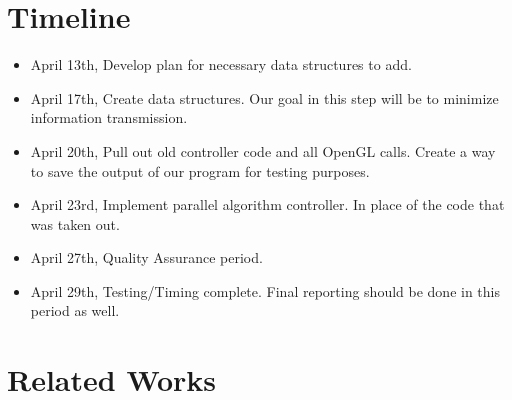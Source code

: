 \documentclass{acmsiggraph}
\begin{document}
\section*{Timeline}
\begin{itemize}
\item April 13th, Develop plan for necessary data structures to add. 
\item April 17th, Create data structures. Our goal in this step will be to
minimize information transmission.
\item April 20th, Pull out old controller code and all OpenGL calls. Create a
way to save the output of our program for testing purposes. 
\item April 23rd, Implement parallel algorithm controller. In place of the code
that was taken out.
\item April 27th, Quality Assurance period.
\item April 29th, Testing/Timing complete. Final reporting should be done in
this period as well.
\end{itemize}

\section*{Related Works}
\end{document}
